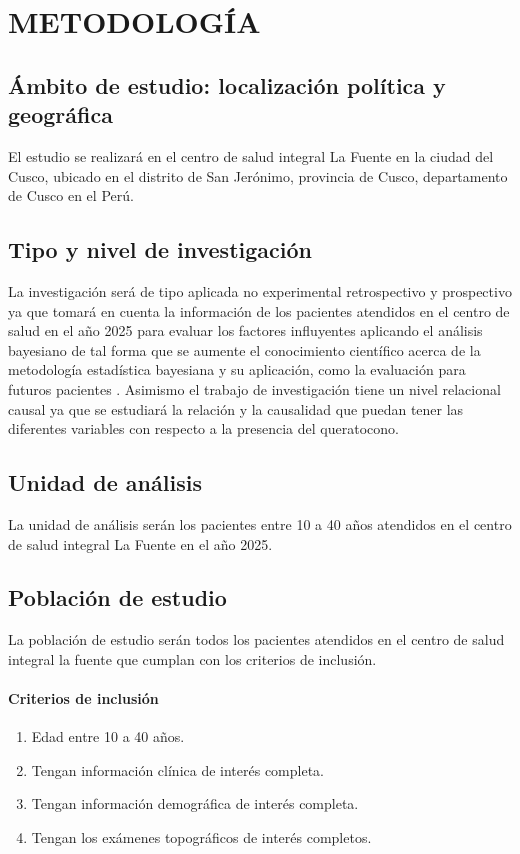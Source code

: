 \newpage
\chapter{METODOLOGÍA}

\section{Ámbito de estudio: localización política y geográfica}
El estudio se realizará en el centro de salud integral La Fuente en la ciudad del Cusco, ubicado en el distrito de San Jerónimo, provincia de Cusco, departamento de Cusco en el Perú.

\section{Tipo y nivel de investigación}
La investigación será de tipo aplicada no experimental retrospectivo y prospectivo ya que tomará en cuenta la información de los pacientes atendidos en el centro de salud en el año 2025 para evaluar los factores influyentes aplicando el análisis bayesiano de tal forma que se aumente el conocimiento científico acerca de la metodología estadística bayesiana y su aplicación, como la evaluación para futuros pacientes \citep{hernandez2020metodologia}.
Asimismo el trabajo de investigación tiene un nivel relacional causal ya que se estudiará la relación y la causalidad que puedan tener las diferentes variables con respecto a la presencia del queratocono.

\section{Unidad de análisis}
La unidad de análisis serán los pacientes entre 10 a 40 años atendidos en el centro de salud integral La Fuente en el año 2025.

\section{Población de estudio}
La población de estudio serán todos los pacientes atendidos en el centro de salud integral la fuente que cumplan con los criterios de inclusión.

\subsubsection{Criterios de inclusión}
\begin{enumerate}
    \item Edad entre 10 a 40 años.
    \item Tengan información clínica de interés completa.
    \item Tengan información demográfica de interés completa.
    \item Tengan los exámenes topográficos de interés completos. 
\end{enumerate}


